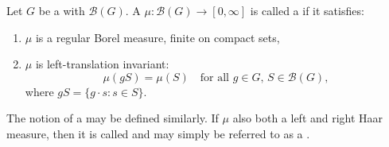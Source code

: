 \begin{definition} \label{definition:haar_measure_on_a_locally_compact_group}
    Let \(G\) be a  with  \(\mathcal{B}(G)\). 
    A  \(\mu : \mathcal{B}(G) \to [0, \infty]\) is called a  if it satisfies:
    \begin{enumerate}
    \item \(\mu\) is a regular Borel measure, finite on compact sets,
    \item \(\mu\) is left-translation invariant:
    \[
        \mu(gS) = \mu(S) \quad \text{for all } g \in G, \, S \in \mathcal{B}(G),
    \]
    where \(gS = \{g \cdot s : s \in S \}\).
    \end{enumerate}
    The notion of a  may be defined similarly. If \(\mu\) also both a left and right Haar measure, then it is called  and may simply be referred to as a .
\end{definition}
